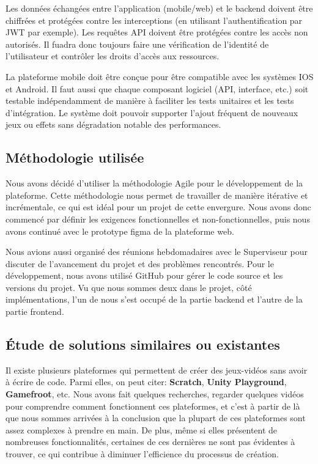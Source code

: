 \documentclass[12pt]{article}        %
\begin{document}
Les données échangées entre l'application (mobile/web) et le backend
doivent être chiffrées et protégées contre les interceptions
(en utilisant l'authentification par JWT par exemple). Les requêtes API
doivent être protégées contre les accès non autorisés. Il fuadra donc 
toujours faire une vérification de l'identité de l'utilisateur et 
contrôler les droits d'accès aux ressources.

La plateforme mobile doit être conçue pour être compatible avec les 
systèmes IOS et Android. Il faut aussi que chaque composant logiciel
(API, interface, etc.) soit testable indépendamment de manière à
faciliter les tests unitaires et les tests d'intégration. Le système doit
pouvoir supporter l'ajout fréquent de nouveaux jeux ou effets sans 
dégradation notable des performances. 

\subsection{Méthodologie utilisée}
\label{Méthodologie}
Nous avons décidé d'utiliser la méthodologie Agile pour le développement 
de la plateforme. Cette méthodologie nous permet de travailler de manière 
itérative et incrémentale, ce qui est idéal pour un projet de cette 
envergure. Nous avons donc commencé par définir les exigences 
fonctionnelles et non-fonctionnelles, puis nous avons continué avec le 
prototype figma de la plateforme web.

Nous avions aussi organisé des réunions hebdomadaires avec le Superviseur pour discuter de l'avancement
du projet et des problèmes rencontrés. Pour le développement, nous avons utilisé GitHub pour
gérer le code source et les versions du projet. Vu que nous sommes deux dans le projet,
côté implémentations, l'un de nous s'est occupé de la partie backend et l'autre de la partie frontend.

\subsection{Étude de solutions similaires ou existantes}
\label{Étude de solutions}
Il existe plusieurs plateformes qui permettent de créer des jeux-vidéos sans avoir à écrire de code.
Parmi elles, on peut citer: \textbf{Scratch}, \textbf{Unity Playground}, \textbf{Gamefroot}, etc. 
Nous avons fait quelques recherches, regarder quelques vidéos pour comprendre comment fonctionnent 
ces plateformes, et c'est à partir de là que nous sommes arrivées à la conclusion que la plupart de 
ces plateformes sont assez complexes à prendre en main. De plus, même si elles présentent de nombreuses 
fonctionnalités, certaines de ces dernières ne sont pas évidentes à trouver, ce qui contribue à diminuer 
l'efficience du processus de création.
\end{document}
